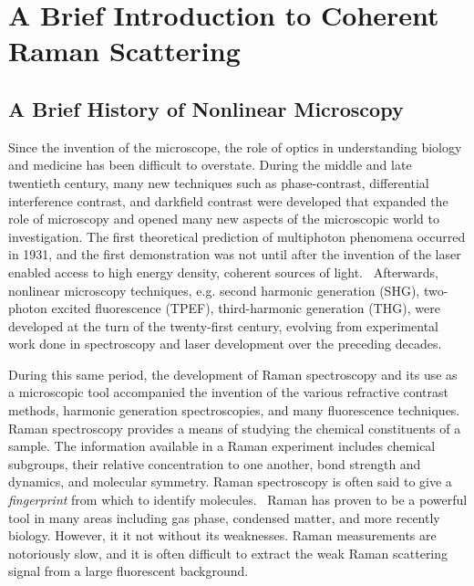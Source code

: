 
\chapter{A Brief Introduction to  Coherent Raman Scattering} %

\label{Chapter2} %


\section{A Brief History of Nonlinear Microscopy}
Since the invention of the microscope, the role of optics in understanding biology and medicine has been difficult to overstate. During the middle and late twentieth century, many new techniques such as phase-contrast, differential interference contrast, and darkfield contrast were developed that expanded the role of microscopy and opened many new aspects of the microscopic world to investigation. The first theoretical prediction of multiphoton phenomena occurred in 1931, and the first demonstration was not until after the invention of the laser enabled access to high energy density, coherent sources of light.~\cite{Mayer31,PhysRevLett.7.229} Afterwards, nonlinear microscopy techniques, e.g. second harmonic generation (SHG), two-photon excited fluorescence (TPEF), third-harmonic generation (THG), were   developed at the turn of the twenty-first century, evolving from experimental work done in spectroscopy and laser development over the preceding decades. \cite{HELLWARTH1974318,Fine:71,Freund:86,Denk73}

During this same period, the development of Raman spectroscopy and its use as a microscopic tool accompanied the invention of the  various refractive contrast methods, harmonic generation spectroscopies, and many fluorescence techniques.~\cite{RAMAN:1928aa, doi:10.1002/jrs.1486}  Raman spectroscopy provides a means of studying the chemical constituents of a sample. The information available in a Raman experiment includes chemical subgroups, their relative concentration to one another, bond strength and dynamics, and molecular symmetry.  Raman spectroscopy is often said to give a \textit{fingerprint} from which to identify molecules.~\cite{doi:10.1080/05704928.2014.923902}  Raman has proven to be a powerful tool in many areas including gas phase, condensed matter, and more recently biology.  However, it it not without its weaknesses.  Raman measurements are notoriously slow, and it is often difficult to extract the weak Raman scattering signal from a large fluorescent background.  

